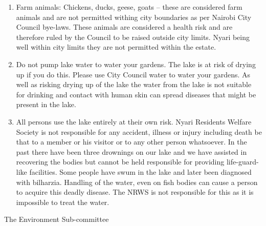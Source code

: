 \documentclass[a4paper,10pt, oneside]{letter}
\begin{document}
\begin{letter} {}
\begin{enumerate}
\item Farm animals: Chickens, ducks, geese, goats -- these are considered farm animals and are not permitted withing city boundaries as per Nairobi City Council bye-laws. These animals are considered a health risk and are therefore ruled by the Council to be raised outside city limits. Nyari being well within city limits they are not permitted within the estate.

\item Do not pump lake water to water your gardens. The lake is at risk of drying up if you do this. Please use City Council water to water your gardens. As well as risking drying up of the lake the water from the lake is not suitable for drinking and contact with human skin can spread diseases that might be present in the lake. 

\item All persons use the lake entirely at their own risk. Nyari Residents Welfare Society is not responsible for any accident, illness or injury including death be that to a member or his visitor or to any other person whatsoever. In the past there have been three drownings on our lake and we have assisted in recovering the bodies but cannot be held responsible for providing life-guard-like facilities. Some people have swum in the lake and later been diagnosed with bilharzia. Handling of the water, even on fish bodies can cause a person to acquire this deadly disease. The NRWS is not responsible for this as it is impossible to treat the water. \\
\end{enumerate}

\closing{The Environment Sub-committee}
\end{letter}
\end{document}
